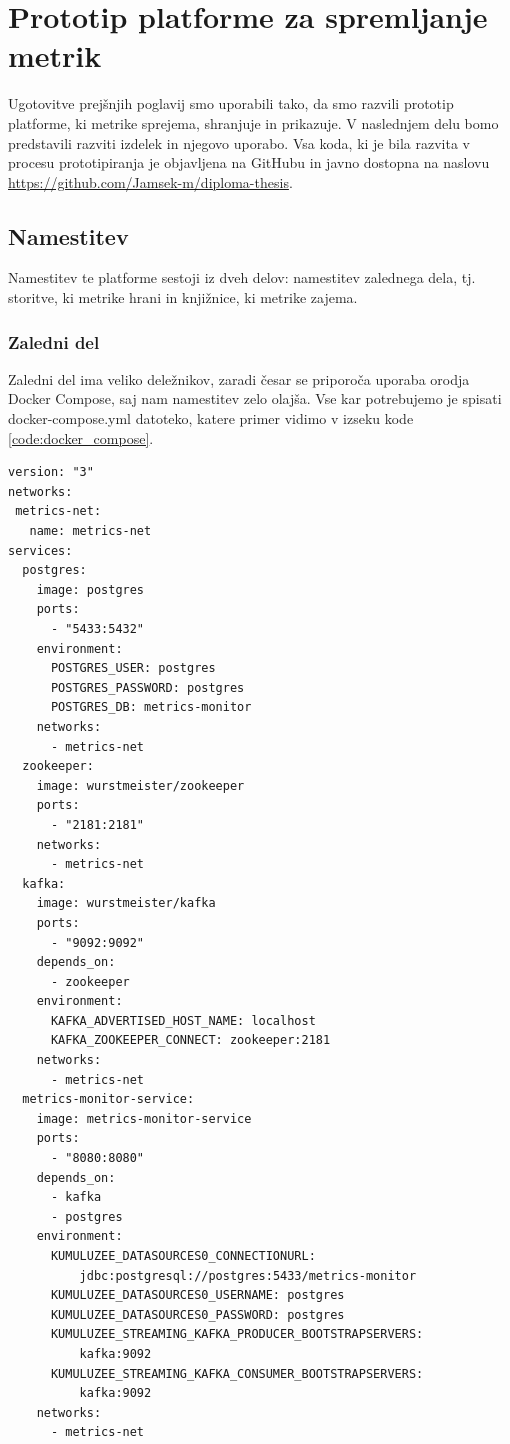 \documentclass[a4paper, 12pt]{book}
\begin{document}
\section{Prototip platforme za spremljanje metrik}
\label{ch3:sec3}

Ugotovitve prejšnjih poglavij smo uporabili tako, da smo razvili prototip platforme, ki metrike sprejema, shranjuje in prikazuje. V naslednjem delu bomo predstavili razviti izdelek in njegovo uporabo. Vsa koda, ki je bila razvita v procesu prototipiranja je objavljena na GitHubu in javno dostopna na naslovu \url{https://github.com/Jamsek-m/diploma-thesis}.

\subsection{Namestitev}
\label{ch3:sec3:sub1}

Namestitev te platforme sestoji iz dveh delov: namestitev zalednega dela, tj. storitve, ki metrike hrani in knjižnice, ki metrike zajema.

\subsubsection{Zaledni del}

Zaledni del ima veliko deležnikov, zaradi česar se priporoča uporaba orodja Docker Compose, saj nam namestitev zelo olajša. Vse kar potrebujemo je spisati docker-compose.yml datoteko, katere primer vidimo v izseku kode \ref{code:docker_compose}.

\begin{lstlisting}[label=code:docker_compose, caption=Primer datoteke docker-compose.yml]
version: "3"
networks:
 metrics-net:
   name: metrics-net
services:
  postgres:
    image: postgres
    ports:
      - "5433:5432"
    environment:
      POSTGRES_USER: postgres
      POSTGRES_PASSWORD: postgres
      POSTGRES_DB: metrics-monitor
    networks:
      - metrics-net
  zookeeper:
    image: wurstmeister/zookeeper
    ports:
      - "2181:2181"
    networks:
      - metrics-net
  kafka:
    image: wurstmeister/kafka
    ports:
      - "9092:9092"
    depends_on:
      - zookeeper
    environment:
      KAFKA_ADVERTISED_HOST_NAME: localhost
      KAFKA_ZOOKEEPER_CONNECT: zookeeper:2181
    networks:
      - metrics-net
  metrics-monitor-service:
    image: metrics-monitor-service
    ports:
      - "8080:8080"
    depends_on:
      - kafka
      - postgres
    environment:
      KUMULUZEE_DATASOURCES0_CONNECTIONURL:
          jdbc:postgresql://postgres:5433/metrics-monitor
      KUMULUZEE_DATASOURCES0_USERNAME: postgres
      KUMULUZEE_DATASOURCES0_PASSWORD: postgres
      KUMULUZEE_STREAMING_KAFKA_PRODUCER_BOOTSTRAPSERVERS:
          kafka:9092
      KUMULUZEE_STREAMING_KAFKA_CONSUMER_BOOTSTRAPSERVERS:
          kafka:9092
    networks:
      - metrics-net
\end{lstlisting}
\end{document}
